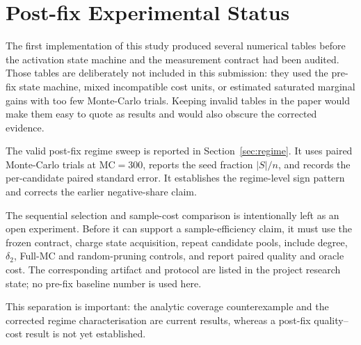 \section{Post-fix Experimental Status}
\label{sec:experiments}

The first implementation of this study produced several numerical tables before the activation
state machine and the measurement contract had been audited.  Those tables are deliberately not
included in this submission: they used the pre-fix state machine, mixed incompatible cost units,
or estimated saturated marginal gains with too few Monte-Carlo trials.  Keeping invalid tables in
the paper would make them easy to quote as results and would also obscure the corrected evidence.

The valid post-fix regime sweep is reported in Section~\ref{sec:regime}.  It uses paired
Monte-Carlo trials at $\mathrm{MC}=300$, reports the seed fraction $|S|/n$, and records the
per-candidate paired standard error.  It establishes the regime-level sign pattern and corrects
the earlier negative-share claim.

The sequential selection and sample-cost comparison is intentionally left as an open experiment.
Before it can support a sample-efficiency claim, it must use the frozen contract, charge state
acquisition, repeat candidate pools, include degree, $\delta_2$, Full-MC and random-pruning
controls, and report paired quality and oracle cost.  The corresponding artifact and protocol are
listed in the project research state; no pre-fix baseline number is used here.

This separation is important: the analytic coverage counterexample and the corrected regime
characterisation are current results, whereas a post-fix quality--cost result is not yet
established.
